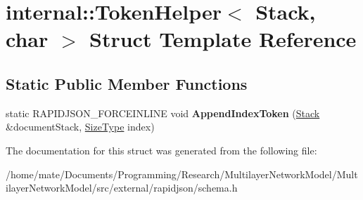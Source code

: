 \hypertarget{structinternal_1_1TokenHelper_3_01Stack_00_01char_01_4}{}\section{internal\+:\+:Token\+Helper$<$ Stack, char $>$ Struct Template Reference}
\label{structinternal_1_1TokenHelper_3_01Stack_00_01char_01_4}
\subsection*{Static Public Member Functions}
\begin{DoxyCompactItemize}
\item 
static R\+A\+P\+I\+D\+J\+S\+O\+N\+\_\+\+F\+O\+R\+C\+E\+I\+N\+L\+I\+NE void {\bfseries Append\+Index\+Token} (\hyperlink{classinternal_1_1Stack}{Stack} \&document\+Stack, \hyperlink{rapidjson_8h_a5ed6e6e67250fadbd041127e6386dcb5}{Size\+Type} index)\hypertarget{structinternal_1_1TokenHelper_3_01Stack_00_01char_01_4_a5d635eb7590e098c3340c9e5dcc72ae3}{}\label{structinternal_1_1TokenHelper_3_01Stack_00_01char_01_4_a5d635eb7590e098c3340c9e5dcc72ae3}

\end{DoxyCompactItemize}


The documentation for this struct was generated from the following file\+:\begin{DoxyCompactItemize}
\item 
/home/mate/\+Documents/\+Programming/\+Research/\+Multilayer\+Network\+Model/\+Multilayer\+Network\+Model/src/external/rapidjson/schema.\+h\end{DoxyCompactItemize}
